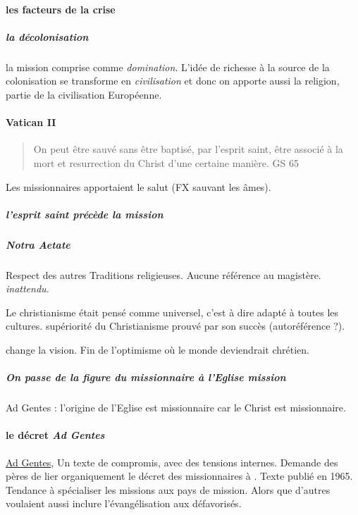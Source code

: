 \paragraph{les facteurs de la crise} 
\subparagraph{la décolonisation} la mission comprise comme \textit{domination}. L'idée de richesse à la source de la colonisation se transforme en \textit{civilisation} et donc on apporte aussi la religion, partie de la civilisation Européenne.

\paragraph{Vatican II}
\begin{quote}
On peut être sauvé sans être baptisé, par l'esprit saint, être associé à la mort et resurrection du Christ d'une certaine manière.
GS 65
\end{quote}

Les missionnaires apportaient le salut (FX sauvant les âmes). 

\subparagraph{l'esprit saint précède la mission}

\subparagraph{Notra Aetate} Respect des autres Traditions religieuses. Aucune référence au magistère. \textit{inattendu.}

\begin{Synthesis}
Le christianisme était pensé comme universel, c'est à dire adapté à toutes les cultures.
supériorité du Christianisme prouvé par son succès (autoréférence ?).
\end{Synthesis}
\NA change la vision. Fin de l'optimisme où le monde deviendrait chrétien. 

\subparagraph{On passe de la figure du missionnaire à l'Eglise mission} Ad Gentes  : l'origine de l'Eglise est missionnaire car le Christ est missionnaire. 

\paragraph{le décret \textit{Ad Gentes}} \href{https://www.vatican.va/archive/hist_councils/ii_vatican_council/documents/vat-ii\_decree\_19651207\_ad-gentes\_fr.html}{Ad Gentes}, Un texte de compromis, avec des tensions internes. Demande des pères de lier organiquement le décret des missionnaires à \LG. Texte publié en 1965. Tendance à spécialiser les missions aux pays de mission. Alors que d'autres voulaient aussi inclure l'évangélisation aux défavorisés.



